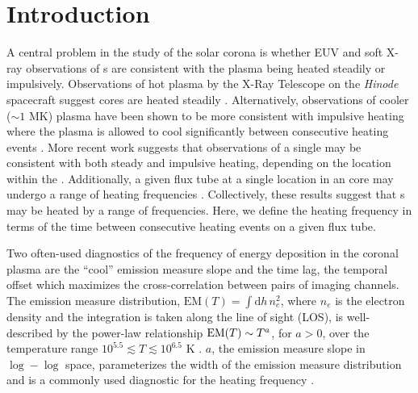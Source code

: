 \section{Introduction}\label{sec:introduction}

A central problem in the study of the solar corona is whether EUV and soft X-ray observations of \AR s are consistent with the plasma being heated steadily or impulsively.
Observations of hot plasma by the X-Ray Telescope \citep[XRT,][]{golub_x-ray_2007} on the \textit{Hinode} spacecraft \citep{kosugi_hinode_2007} suggest \AR{} cores are heated steadily \citep[e.g.][]{warren_constraints_2011,winebarger_using_2011}.
Alternatively, observations of cooler ($\sim1$ MK) plasma have been shown to be more consistent with impulsive heating where the plasma is allowed to cool significantly between consecutive heating events \citep[e.g][]{winebarger_evolving_2003,mulu-moore_determining_2011,ugarte-urra_investigation_2006,viall_patterns_2011,viall_evidence_2012}.
More recent work \citep{del_zanna_evolution_2015,bradshaw_patterns_2016} suggests that observations of a single \AR{} may be consistent with both steady and impulsive heating, depending on the location within the \AR{}.
Additionally, a given flux tube at a single location in an \AR{} core may undergo a range of heating frequencies \citep[e.g.][]{cargill_active_2014}.
Collectively, these results suggest that \AR s may be heated by a range of frequencies.
Here, we define the heating frequency in terms of the time between consecutive heating events on a given flux tube.

Two often-used diagnostics of the frequency of energy deposition in the coronal plasma are the ``cool'' emission measure slope and the time lag, the temporal offset which maximizes the cross-correlation between pairs of imaging channels.
The emission measure distribution, $\mathrm{EM}(T)=\int\mathrm{d}h\,n_e^2$, where $n_e$ is the electron density and the integration is taken along the line of sight (LOS), is well-described by the power-law relationship $\textup{EM}(T)\sim T^a$, for $a>0$, over the temperature range $10^{5.5}\lesssim T\lesssim10^{6.5}$ K \citep{jordan_structure_1975,jordan_structure_1976}.
$a$, the emission measure slope in $\log-\log$ space, parameterizes the width of the emission measure distribution and is a commonly used diagnostic for the heating frequency \citep[e.g.][]{tripathi_emission_2011,winebarger_using_2011,warren_constraints_2011,mulu-moore_can_2011,bradshaw_diagnosing_2012,schmelz_cold_2012,reep_diagnosing_2013,del_zanna_evolution_2015}.

